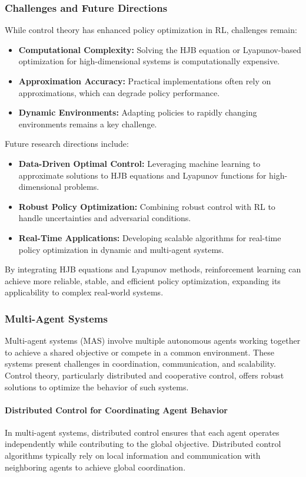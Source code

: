 \documentclass{IEEEojcsys}
\begin{document}
\subsubsection{Challenges and Future Directions}
While control theory has enhanced policy optimization in RL, challenges remain:
\begin{itemize}
    \item \textbf{Computational Complexity:} Solving the HJB equation or Lyapunov-based optimization for high-dimensional systems is computationally expensive.
    \item \textbf{Approximation Accuracy:} Practical implementations often rely on approximations, which can degrade policy performance.
    \item \textbf{Dynamic Environments:} Adapting policies to rapidly changing environments remains a key challenge.
\end{itemize}

Future research directions include:
\begin{itemize}
    \item \textbf{Data-Driven Optimal Control:} Leveraging machine learning to approximate solutions to HJB equations and Lyapunov functions for high-dimensional problems.
    \item \textbf{Robust Policy Optimization:} Combining robust control with RL to handle uncertainties and adversarial conditions.
    \item \textbf{Real-Time Applications:} Developing scalable algorithms for real-time policy optimization in dynamic and multi-agent systems.
\end{itemize}

By integrating HJB equations and Lyapunov methods, reinforcement learning can achieve more reliable, stable, and efficient policy optimization, expanding its applicability to complex real-world systems.

\subsubsection{Multi-Agent Systems}
Multi-agent systems (MAS) involve multiple autonomous agents working together to achieve a shared objective or compete in a common environment. These systems present challenges in coordination, communication, and scalability. Control theory, particularly distributed and cooperative control, offers robust solutions to optimize the behavior of such systems.

\paragraph{Distributed Control for Coordinating Agent Behavior}
In multi-agent systems, distributed control ensures that each agent operates independently while contributing to the global objective. Distributed control algorithms typically rely on local information and communication with neighboring agents to achieve global coordination.
\end{document}
